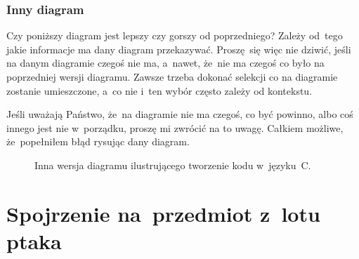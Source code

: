 \documentclass[10pt,t]{beamer}
\begin{document}
\begin{frame}
  \frametitle{Inny diagram}


  Czy poniższy diagram jest lepszy czy gorszy od poprzedniego? Zależy
  od~tego jakie informacje ma dany diagram przekazywać. Proszę~się więc nie
  dziwić, jeśli na danym diagramie czegoś nie ma, a~nawet, że~nie ma czegoś
  co było na poprzedniej wersji diagramu. Zawsze trzeba dokonać selekcji co
  na diagramie zostanie umieszczone, a~co nie i~ten wybór często zależy
  od kontekstu.

  Jeśli uważają Państwo, że~na diagramie nie ma czegoś, co być powinno,
  albo coś innego jest nie w~porządku, \alert{proszę} mi zwrócić na to
  uwagę. Całkiem możliwe, że~popełniłem błąd rysując dany diagram.






  \begin{figure}

    \label{fig:Also-creating-code-in-C}



    \caption{Inna wersja diagramu ilustrującego tworzenie kodu w~języku~C.}


  \end{figure}

\end{frame}










\section{Spojrzenie na~przedmiot z~lotu ptaka}
\end{document}
